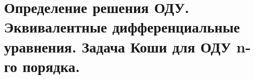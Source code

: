 {
	\section{Определение решения ОДУ. Эквивалентные дифференциальные уравнения. Задача Коши для ОДУ n-го порядка.}


	\newpage
}